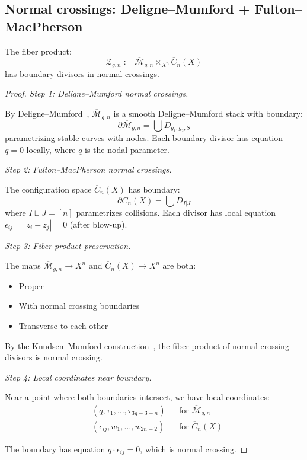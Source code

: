 \subsection{Normal crossings: Deligne--Mumford + Fulton--MacPherson}
\label{subsec:normal-crossings-combined}

\begin{theorem}\label{thm:normal-crossings-persist}
The fiber product:
\[\mathcal{Z}_{g,n} := \overline{\mathcal{M}}_{g,n} \times_{X^n} \overline{C}_n(X)\]
has boundary divisors in normal crossings.
\end{theorem}

\begin{proof}
\emph{Step 1: Deligne--Mumford normal crossings.}

By Deligne--Mumford~\cite{DeligneM69}, $\overline{\mathcal{M}}_{g,n}$ is a smooth Deligne--Mumford stack with boundary:
\[\partial \overline{\mathcal{M}}_{g,n} = \bigcup D_{g_1, g_2, S}\]
parametrizing stable curves with nodes. Each boundary divisor has equation $q = 0$ locally, where $q$ is the nodal parameter.

\emph{Step 2: Fulton--MacPherson normal crossings.}

The configuration space $\overline{C}_n(X)$ has boundary:
\[\partial \overline{C}_n(X) = \bigcup D_{I|J}\]
where $I \sqcup J = [n]$ parametrizes collisions. Each divisor has local equation $\epsilon_{ij} = |z_i - z_j| = 0$ (after blow-up).

\emph{Step 3: Fiber product preservation.}

The maps $\overline{\mathcal{M}}_{g,n} \to X^n$ and $\overline{C}_n(X) \to X^n$ are both:
\begin{itemize}
\item Proper
\item With normal crossing boundaries
\item Transverse to each other
\end{itemize}

By the Knudsen--Mumford construction~\cite{Knudsen83}, the fiber product of normal crossing divisors is normal crossing.

\emph{Step 4: Local coordinates near boundary.}

Near a point where both boundaries intersect, we have local coordinates:
\begin{align*}
&(q, \tau_1, \ldots, \tau_{3g-3+n}) && \text{for } \overline{\mathcal{M}}_{g,n} \\
&(\epsilon_{ij}, w_1, \ldots, w_{2n-2}) && \text{for } \overline{C}_n(X)
\end{align*}

The boundary has equation $q \cdot \epsilon_{ij} = 0$, which is normal crossing. \qedhere
\end{proof}

